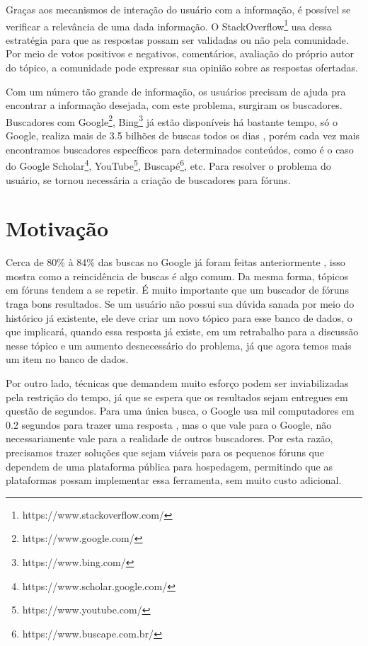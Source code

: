 Graças aos mecanismos de interação do usuário com a informação, é possível se verificar a relevância de uma dada informação. O StackOverflow\footnote{https://www.stackoverflow.com/} usa dessa estratégia para que as respostas possam ser validadas ou não pela comunidade. Por meio de votos positivos e negativos, comentários, avaliação do próprio autor do tópico, a comunidade pode expressar sua opinião sobre as respostas ofertadas.

Com um número tão grande de informação, os usuários precisam de ajuda pra encontrar a informação desejada, com este problema, surgiram os buscadores. Buscadores com Google\footnote{https://www.google.com/}, Bing\footnote{https://www.bing.com/} já estão disponíveis há bastante tempo, só o Google, realiza mais de 3.5 bilhões de buscas todos os dias \cite{googlesearch}, porém cada vez mais encontramos buscadores específicos para determinados conteúdos, como é o caso do Google Scholar\footnote{https://www.scholar.google.com/}, YouTube\footnote{https://www.youtube.com/}, Buscapé\footnote{https://www.buscape.com.br/}, etc. Para resolver o problema do usuário, se tornou necessária a criação de buscadores para fóruns.


\section{Motivação}
Cerca de 80\% à 84\% das buscas no Google já foram feitas anteriormente \cite{googleexplained}, isso mostra como a reincidência de buscas é algo comum. Da mesma forma, tópicos em fóruns tendem a se repetir. É muito importante que um buscador de fóruns traga bons resultados. Se um usuário não possui sua dúvida sanada por meio do histórico já existente, ele deve criar um novo tópico para esse banco de dados, o que implicará, quando essa resposta já existe, em um retrabalho para a discussão nesse tópico e um aumento desnecessário do problema, já que agora temos mais um item no banco de dados.

Por outro lado, técnicas que demandem muito esforço podem ser inviabilizadas pela restrição do tempo, já que se espera que os resultados sejam entregues em questão de segundos. Para uma única busca, o Google usa mil computadores em 0.2 segundos para trazer uma resposta \cite{buildinggoogle}, mas o que vale para o Google, não necessariamente vale para a realidade de outros buscadores. Por esta razão, precisamos trazer soluções que sejam viáveis para os pequenos fóruns que dependem de uma plataforma pública para hospedagem, permitindo que as plataformas possam implementar essa ferramenta, sem muito custo adicional.

